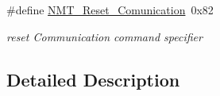 \begin{DoxyCompactItemize}
\mbox{\label{group___c_a_nopen___n_m_t__speficications_gafd16bdbe636d7c761a9e015a7d7653ce}} 
\#define \mbox{\hyperlink{group___c_a_nopen___n_m_t__speficications_gafd16bdbe636d7c761a9e015a7d7653ce}{N\+M\+T\+\_\+\+Reset\+\_\+\+Comunication}}~0x82
\begin{DoxyCompactList}\small\item\em \textquotesingle{}reset Communication\textquotesingle{} command specifier \end{DoxyCompactList}\end{DoxyCompactItemize}


\subsection{Detailed Description}
